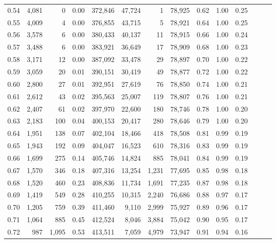 \begin{tabular}{rrrrrrrrrrrrrr}
0.54 &  4,081 &      0 &  0.00 &  372,846 &   47,724 &       1 &  78,925 &  0.62 &  1.00 &      0.25 \\
0.55 &  4,009 &      4 &  0.00 &  376,855 &   43,715 &       5 &  78,921 &  0.64 &  1.00 &      0.25 \\
0.56 &  3,578 &      6 &  0.00 &  380,433 &   40,137 &      11 &  78,915 &  0.66 &  1.00 &      0.24 \\
0.57 &  3,488 &      6 &  0.00 &  383,921 &   36,649 &      17 &  78,909 &  0.68 &  1.00 &      0.23 \\
0.58 &  3,171 &     12 &  0.00 &  387,092 &   33,478 &      29 &  78,897 &  0.70 &  1.00 &      0.22 \\
0.59 &  3,059 &     20 &  0.01 &  390,151 &   30,419 &      49 &  78,877 &  0.72 &  1.00 &      0.22 \\
0.60 &  2,800 &     27 &  0.01 &  392,951 &   27,619 &      76 &  78,850 &  0.74 &  1.00 &      0.21 \\
0.61 &  2,612 &     43 &  0.02 &  395,563 &   25,007 &     119 &  78,807 &  0.76 &  1.00 &      0.21 \\
0.62 &  2,407 &     61 &  0.02 &  397,970 &   22,600 &     180 &  78,746 &  0.78 &  1.00 &      0.20 \\
0.63 &  2,183 &    100 &  0.04 &  400,153 &   20,417 &     280 &  78,646 &  0.79 &  1.00 &      0.20 \\
0.64 &  1,951 &    138 &  0.07 &  402,104 &   18,466 &     418 &  78,508 &  0.81 &  0.99 &      0.19 \\
0.65 &  1,943 &    192 &  0.09 &  404,047 &   16,523 &     610 &  78,316 &  0.83 &  0.99 &      0.19 \\
0.66 &  1,699 &    275 &  0.14 &  405,746 &   14,824 &     885 &  78,041 &  0.84 &  0.99 &      0.19 \\
0.67 &  1,570 &    346 &  0.18 &  407,316 &   13,254 &   1,231 &  77,695 &  0.85 &  0.98 &      0.18 \\
0.68 &  1,520 &    460 &  0.23 &  408,836 &   11,734 &   1,691 &  77,235 &  0.87 &  0.98 &      0.18 \\
0.69 &  1,419 &    549 &  0.28 &  410,255 &   10,315 &   2,240 &  76,686 &  0.88 &  0.97 &      0.17 \\
0.70 &  1,205 &    759 &  0.39 &  411,460 &    9,110 &   2,999 &  75,927 &  0.89 &  0.96 &      0.17 \\
0.71 &  1,064 &    885 &  0.45 &  412,524 &    8,046 &   3,884 &  75,042 &  0.90 &  0.95 &      0.17 \\
0.72 &    987 &  1,095 &  0.53 &  413,511 &    7,059 &   4,979 &  73,947 &  0.91 &  0.94 &      0.16 \\

\end{tabular}
